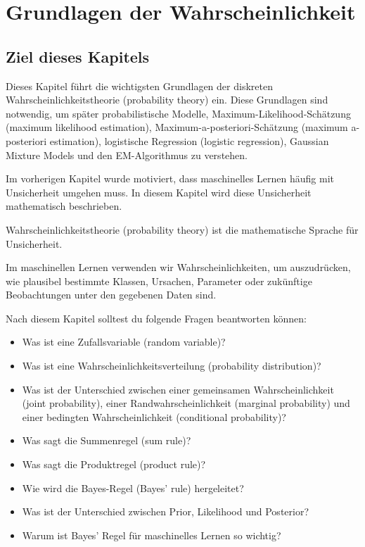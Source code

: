 \chapter{Grundlagen der Wahrscheinlichkeit}

\section{Ziel dieses Kapitels}

Dieses Kapitel führt die wichtigsten Grundlagen der diskreten Wahrscheinlichkeitstheorie (probability theory) ein.
Diese Grundlagen sind notwendig, um später probabilistische Modelle, Maximum-Likelihood-Schätzung (maximum likelihood estimation), Maximum-a-posteriori-Schätzung (maximum a-posteriori estimation), logistische Regression (logistic regression), Gaussian Mixture Models und den EM-Algorithmus zu verstehen.

Im vorherigen Kapitel wurde motiviert, dass maschinelles Lernen häufig mit Unsicherheit umgehen muss.
In diesem Kapitel wird diese Unsicherheit mathematisch beschrieben.

\begin{conceptbox}
Wahrscheinlichkeitstheorie (probability theory) ist die mathematische Sprache für Unsicherheit.

Im maschinellen Lernen verwenden wir Wahrscheinlichkeiten, um auszudrücken, wie plausibel bestimmte Klassen, Ursachen, Parameter oder zukünftige Beobachtungen unter den gegebenen Daten sind.
\end{conceptbox}

Nach diesem Kapitel solltest du folgende Fragen beantworten können:

\begin{itemize}
    \item Was ist eine Zufallsvariable (random variable)?
    \item Was ist eine Wahrscheinlichkeitsverteilung (probability distribution)?
    \item Was ist der Unterschied zwischen einer gemeinsamen Wahrscheinlichkeit (joint probability), einer Randwahrscheinlichkeit (marginal probability) und einer bedingten Wahrscheinlichkeit (conditional probability)?
    \item Was sagt die Summenregel (sum rule)?
    \item Was sagt die Produktregel (product rule)?
    \item Wie wird die Bayes-Regel (Bayes' rule) hergeleitet?
    \item Was ist der Unterschied zwischen Prior, Likelihood und Posterior?
    \item Warum ist Bayes' Regel für maschinelles Lernen so wichtig?
\end{itemize}


